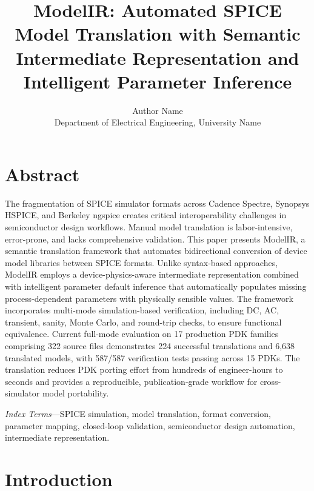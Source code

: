 \documentclass[10pt,twocolumn]{article}
\title{ModelIR: Automated SPICE Model Translation with Semantic Intermediate Representation and Intelligent Parameter Inference}
\author{Author Name \\ Department of Electrical Engineering, University Name}
\date{}
\begin{document}
\maketitle

\section*{Abstract}

The fragmentation of SPICE simulator formats across Cadence Spectre, Synopsys HSPICE, and Berkeley ngspice creates critical interoperability challenges in semiconductor design workflows. Manual model translation is labor-intensive, error-prone, and lacks comprehensive validation. This paper presents ModelIR, a semantic translation framework that automates bidirectional conversion of device model libraries between SPICE formats. Unlike syntax-based approaches, ModelIR employs a device-physics-aware intermediate representation combined with intelligent parameter default inference that automatically populates missing process-dependent parameters with physically sensible values. The framework incorporates multi-mode simulation-based verification, including DC, AC, transient, sanity, Monte Carlo, and round-trip checks, to ensure functional equivalence. Current full-mode evaluation on 17 production PDK families comprising 322 source files demonstrates 224 successful translations and 6,638 translated models, with 587/587 verification tests passing across 15 PDKs. The translation reduces PDK porting effort from hundreds of engineer-hours to seconds and provides a reproducible, publication-grade workflow for cross-simulator model portability.

\textit{Index Terms}---SPICE simulation, model translation, format conversion, parameter mapping, closed-loop validation, semiconductor design automation, intermediate representation.

\section{Introduction}
\end{document}
